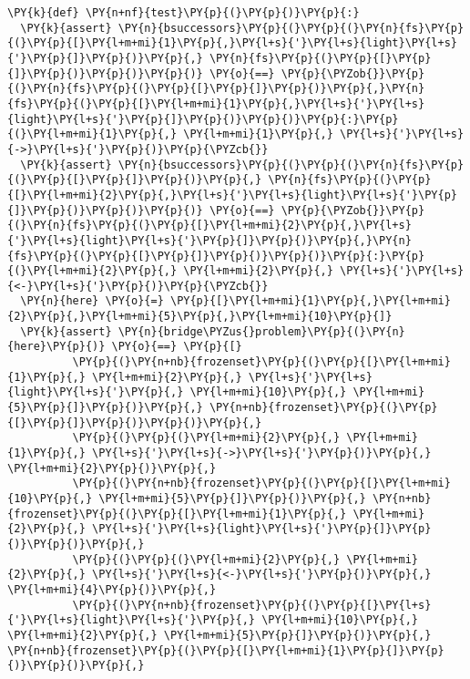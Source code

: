 \begin{Verbatim}[commandchars=\\\{\}]
\PY{k}{def} \PY{n+nf}{test}\PY{p}{(}\PY{p}{)}\PY{p}{:}
  \PY{k}{assert} \PY{n}{bsuccessors}\PY{p}{(}\PY{p}{(}\PY{n}{fs}\PY{p}{(}\PY{p}{[}\PY{l+m+mi}{1}\PY{p}{,}\PY{l+s}{'}\PY{l+s}{light}\PY{l+s}{'}\PY{p}{]}\PY{p}{)}\PY{p}{,} \PY{n}{fs}\PY{p}{(}\PY{p}{[}\PY{p}{]}\PY{p}{)}\PY{p}{)}\PY{p}{)} \PY{o}{==} \PY{p}{\PYZob{}}\PY{p}{(}\PY{n}{fs}\PY{p}{(}\PY{p}{[}\PY{p}{]}\PY{p}{)}\PY{p}{,}\PY{n}{fs}\PY{p}{(}\PY{p}{[}\PY{l+m+mi}{1}\PY{p}{,}\PY{l+s}{'}\PY{l+s}{light}\PY{l+s}{'}\PY{p}{]}\PY{p}{)}\PY{p}{)}\PY{p}{:}\PY{p}{(}\PY{l+m+mi}{1}\PY{p}{,} \PY{l+m+mi}{1}\PY{p}{,} \PY{l+s}{'}\PY{l+s}{->}\PY{l+s}{'}\PY{p}{)}\PY{p}{\PYZcb{}}
  \PY{k}{assert} \PY{n}{bsuccessors}\PY{p}{(}\PY{p}{(}\PY{n}{fs}\PY{p}{(}\PY{p}{[}\PY{p}{]}\PY{p}{)}\PY{p}{,} \PY{n}{fs}\PY{p}{(}\PY{p}{[}\PY{l+m+mi}{2}\PY{p}{,}\PY{l+s}{'}\PY{l+s}{light}\PY{l+s}{'}\PY{p}{]}\PY{p}{)}\PY{p}{)}\PY{p}{)} \PY{o}{==} \PY{p}{\PYZob{}}\PY{p}{(}\PY{n}{fs}\PY{p}{(}\PY{p}{[}\PY{l+m+mi}{2}\PY{p}{,}\PY{l+s}{'}\PY{l+s}{light}\PY{l+s}{'}\PY{p}{]}\PY{p}{)}\PY{p}{,}\PY{n}{fs}\PY{p}{(}\PY{p}{[}\PY{p}{]}\PY{p}{)}\PY{p}{)}\PY{p}{:}\PY{p}{(}\PY{l+m+mi}{2}\PY{p}{,} \PY{l+m+mi}{2}\PY{p}{,} \PY{l+s}{'}\PY{l+s}{<-}\PY{l+s}{'}\PY{p}{)}\PY{p}{\PYZcb{}}
  \PY{n}{here} \PY{o}{=} \PY{p}{[}\PY{l+m+mi}{1}\PY{p}{,}\PY{l+m+mi}{2}\PY{p}{,}\PY{l+m+mi}{5}\PY{p}{,}\PY{l+m+mi}{10}\PY{p}{]}
  \PY{k}{assert} \PY{n}{bridge\PYZus{}problem}\PY{p}{(}\PY{n}{here}\PY{p}{)} \PY{o}{==} \PY{p}{[}
          \PY{p}{(}\PY{n+nb}{frozenset}\PY{p}{(}\PY{p}{[}\PY{l+m+mi}{1}\PY{p}{,} \PY{l+m+mi}{2}\PY{p}{,} \PY{l+s}{'}\PY{l+s}{light}\PY{l+s}{'}\PY{p}{,} \PY{l+m+mi}{10}\PY{p}{,} \PY{l+m+mi}{5}\PY{p}{]}\PY{p}{)}\PY{p}{,} \PY{n+nb}{frozenset}\PY{p}{(}\PY{p}{[}\PY{p}{]}\PY{p}{)}\PY{p}{)}\PY{p}{,} 
          \PY{p}{(}\PY{p}{(}\PY{l+m+mi}{2}\PY{p}{,} \PY{l+m+mi}{1}\PY{p}{,} \PY{l+s}{'}\PY{l+s}{->}\PY{l+s}{'}\PY{p}{)}\PY{p}{,} \PY{l+m+mi}{2}\PY{p}{)}\PY{p}{,} 
          \PY{p}{(}\PY{n+nb}{frozenset}\PY{p}{(}\PY{p}{[}\PY{l+m+mi}{10}\PY{p}{,} \PY{l+m+mi}{5}\PY{p}{]}\PY{p}{)}\PY{p}{,} \PY{n+nb}{frozenset}\PY{p}{(}\PY{p}{[}\PY{l+m+mi}{1}\PY{p}{,} \PY{l+m+mi}{2}\PY{p}{,} \PY{l+s}{'}\PY{l+s}{light}\PY{l+s}{'}\PY{p}{]}\PY{p}{)}\PY{p}{)}\PY{p}{,} 
          \PY{p}{(}\PY{p}{(}\PY{l+m+mi}{2}\PY{p}{,} \PY{l+m+mi}{2}\PY{p}{,} \PY{l+s}{'}\PY{l+s}{<-}\PY{l+s}{'}\PY{p}{)}\PY{p}{,} \PY{l+m+mi}{4}\PY{p}{)}\PY{p}{,} 
          \PY{p}{(}\PY{n+nb}{frozenset}\PY{p}{(}\PY{p}{[}\PY{l+s}{'}\PY{l+s}{light}\PY{l+s}{'}\PY{p}{,} \PY{l+m+mi}{10}\PY{p}{,} \PY{l+m+mi}{2}\PY{p}{,} \PY{l+m+mi}{5}\PY{p}{]}\PY{p}{)}\PY{p}{,} \PY{n+nb}{frozenset}\PY{p}{(}\PY{p}{[}\PY{l+m+mi}{1}\PY{p}{]}\PY{p}{)}\PY{p}{)}\PY{p}{,} 

\end{Verbatim}

